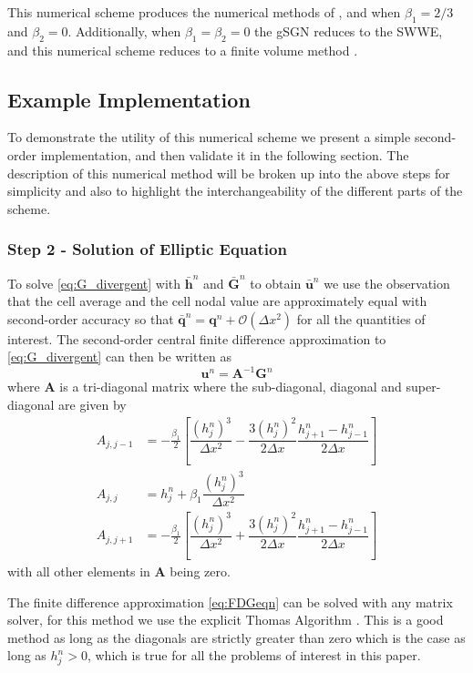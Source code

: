 \documentclass[10pt]{elsarticle}
\newcommand{\vecn}[1]{\boldsymbol{#1}}
\begin{document}
This numerical scheme produces the numerical methods of \citet{Hank-etal-2010-2034}, \citet{Zoppou-etal-2017} and \citet{Pitt-2019} when $\beta_1 = 2/3$ and $\beta_2 = 0$. Additionally, when $\beta_1 = \beta_2 = 0$ the gSGN reduces to the SWWE, and this numerical scheme reduces to a finite volume method \cite{Roberts-2003-129}.  

\subsection{Example Implementation}
To demonstrate the utility of this numerical scheme we present a simple second-order implementation, and then validate it in the following section. The description of this numerical method will be broken up into the above steps for simplicity and also to highlight the interchangeability of the different parts of the scheme.

\subsubsection{Step 2 - Solution of Elliptic Equation}
To solve \eqref{eq:G_divergent} with $\bar{\vecn{h}}^n$ and $\bar{\vecn{G}}^n$ to obtain $\bar{\vecn{u}}^n$ we use the observation that the cell average and the cell nodal value are approximately equal with second-order accuracy so that $\bar{\vecn{q}}^n = {\vecn{q}}^n + \mathcal{O}\left(\Delta x^2\right)$ for all the quantities of interest. The second-order central finite difference approximation to \eqref{eq:G_divergent} can then be written as
\begin{equation}
{\vecn{u}}^n = \vecn{A}^{-1} {\vecn{G}}^n
\label{eq:FDGeqn}
\end{equation}
where $\vecn{A}$ is a tri-diagonal matrix where the sub-diagonal, diagonal and super-diagonal are given by
\begin{align*}
A_{j,j-1} &=  -\frac{\beta_1}{2}  \left[  \dfrac{\left(h_j^n\right)^3}{\Delta x^2} -  \dfrac{3\left(h_j^n\right)^2}{2\Delta x} \dfrac{h_{j+1}^n - h_{j-1}^n}{2\Delta x}\right] \\
A_{j,j} &= h^n_j + \beta_1\dfrac{\left(h_j^n\right)^3}{\Delta x^2} \\
A_{j,j+1} &=  -\frac{\beta_1}{2}  \left[  \dfrac{\left(h_j^n\right)^3}{\Delta x^2} +  \dfrac{3\left(h_j^n\right)^2}{2\Delta x} \dfrac{h_{j+1}^n - h_{j-1}^n}{2\Delta x}\right]
\end{align*}
with all other elements in $\vecn{A}$ being zero. 

The finite difference approximation \eqref{eq:FDGeqn} can be solved with any matrix solver, for this method we use the explicit Thomas Algorithm \cite{Conte-DeBoor-1980}. This is a good method as long as the diagonals are strictly greater than zero which is the case as long as $h_{j}^n > 0$, which is true for all the problems of interest in this paper. 
\end{document}
